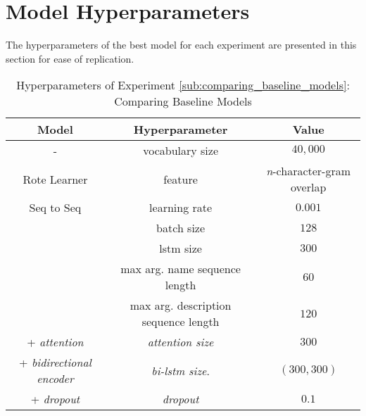\chapter{Model Hyperparameters}
\label{Model Hyperparameters}

The hyperparameters of the best model for each experiment are presented in this section for ease of replication.


\begin{table}[h!]
\begin{center}
\begin{tabular}{ c | c | c  }
    \textbf{Model}                           {}  & \textbf{Hyperparameter}  & \textbf{Value}    \\
    \hline
    -                                 & vocabulary size            & $40,000$ \\
    \hline
    Rote Learner                      & feature                    & \textit{n}-character-gram overlap \\
    \hline
    Seq to Seq                        & learning rate              & $0.001$         \\
                                      & batch size                 & $128$           \\
                                      & lstm size                  & $300$           \\
                                      & max arg. name sequence length         & $60$   \\
                                      & max arg. description sequence length  & $120$  \\
    \hdashline
    + \textit{attention}              & \textit{attention size}    & $300$           \\
    + \textit{bidirectional encoder}  & \textit{bi-lstm size}.     & $(300,300) $    \\
    + \textit{dropout}                & \textit{dropout}           & $0.1$           \\
    \hline
\end{tabular}
\caption {Hyperparameters of Experiment \ref{sub:comparing_baseline_models}: Comparing Baseline Models }
\label{table:hyperparams_name_baseline}
\end{center}
\end{table}


